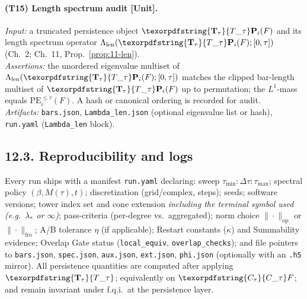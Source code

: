 \documentclass[11pt]{article}
\numberwithin{equation}{section}
\theoremstyle{plain}
\theoremstyle{definition}
\theoremstyle{remark}
\DeclareRobustCommand{\hyp}{\nobreakdash-}
\theoremstyle{plain}
\theoremstyle{definition}
\numberwithin{equation}{section}
\theoremstyle{definition}
\DeclareRobustCommand{\Ttau}{\texorpdfstring{\ensuremath{\mathbf{T}_{\tau}}}{T\_\tau}}
\DeclareRobustCommand{\Ctau}{\texorpdfstring{\ensuremath{C_{\tau}}}{C\_\tau}}
\numberwithin{equation}{section}
\theoremstyle{plain}
\theoremstyle{definition}
\theoremstyle{remark}
\newcommand{\Len}{\Lambda_{\mathrm{len}}}
\providecommand{\Cfun}[1]{\mathsf{C}_{#1}}
\providecommand{\Tfun}[1]{\mathbf{T}_{#1}}
\providecommand{\Ctau}{\Cfun{\tau}}
\providecommand{\Ttau}{\Tfun{\tau}}
\providecommand{\n}{\unskip\space}
\begin{document}
\paragraph{(T15) Length spectrum audit [Unit].}
\emph{Input:} a truncated persistence object \(\Ttau\mathbf{P}_i(F)\) and its length spectrum operator \(\Len(\Ttau\mathbf{P}_i(F);[0,\tau])\) (Ch.~2; Ch.~11, Prop.~\ref{prop:11-len}).\\\n\emph{Assertions:} the unordered eigenvalue multiset of \(\Len(\Ttau\mathbf{P}_i(F);[0,\tau])\) matches the clipped bar\hyp length multiset of \(\Ttau\mathbf{P}_i(F)\) up to permutation; the \(L^1\)\hyp mass equals \(\mathrm{PE}_i^{\le \tau}(F)\). A hash or canonical ordering is recorded for audit.\\\n\emph{Artifacts:} \texttt{bars.json}, \texttt{Lambda\_len.json} (optional eigenvalue list or hash), \texttt{run.yaml} (\texttt{Lambda\_len} block).

\subsection*{12.3. Reproducibility and logs}
Every run ships with a manifest \texttt{run.yaml} declaring: sweep \(\tau_{\min}\!:\Delta\tau\!:\tau_{\max}\); spectral policy \((\beta,M(\tau),t)\); discretization (grid/complex, steps); seeds; software versions; tower index set and cone extension \emph{including the terminal symbol used (e.g.\ \(\lambda_\ast\) or \(\infty\))}; pass\hyp criteria (per\hyp degree vs.\ aggregated); norm choice \(\|\cdot\|_{\mathrm{op}}\) or \(\|\cdot\|_{\mathrm{fro}}\); A/B tolerance \(\eta\) (if applicable); Restart constants (\(\kappa\)) and Summability evidence; Overlap Gate status (\texttt{local\_equiv}, \texttt{overlap\_checks}); and file pointers to \texttt{bars.json}, \texttt{spec.json}, \texttt{aux.json}, \texttt{ext.json}, \texttt{phi.json} (optionally with an \texttt{.h5} mirror). All persistence quantities are computed after applying \(\Ttau\); equivalently on \(\Ctau F\); and remain invariant under f.q.i.\ at the persistence layer.
\end{document}
